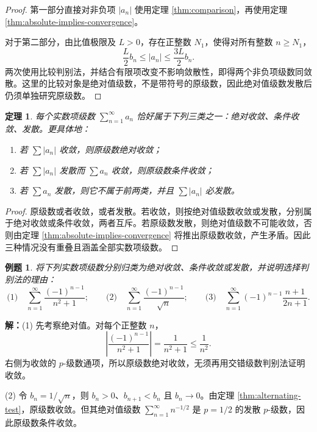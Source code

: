 \documentclass[UTF8,fontset=fandol,11pt]{ctexart}
\newtheorem{theorem}[definition]{定理}
\newtheorem{example}[definition]{例题}
\begin{document}
\begin{proof}
第一部分直接对非负项 $|a_n|$ 使用定理 \ref{thm:comparison}，再使用定理 \ref{thm:absolute-implies-convergence}。

对于第二部分，由比值极限及 $L>0$，存在正整数 $N_1$，使得对所有整数 $n\geq N_1$，
\[
\frac{L}{2}b_n\leq |a_n|\leq\frac{3L}{2}b_n.
\]
两次使用比较判别法，并结合有限项改变不影响敛散性，即得两个非负项级数同敛散。这里的比较对象是绝对值级数，不是带符号的原级数，因此绝对值级数发散后仍须单独研究原级数。
\end{proof}
\begin{theorem}
\label{thm:convergence-classification}每个实数项级数 $\sum_{n=1}^{\infty}a_n$ 恰好属于下列三类之一：绝对收敛、条件收敛、发散。更具体地：
\begin{enumerate}
\item 若 $\sum |a_n|$ 收敛，则原级数绝对收敛；
\item 若 $\sum |a_n|$ 发散而 $\sum a_n$ 收敛，则原级数条件收敛；
\item 若 $\sum a_n$ 发散，则它不属于前两类，并且 $\sum |a_n|$ 必发散。
\end{enumerate}
\end{theorem}
\begin{proof}
原级数或者收敛，或者发散。若收敛，则按绝对值级数收敛或发散，分别属于绝对收敛或条件收敛，两者互斥。若原级数发散，则绝对值级数不可能收敛，否则由定理 \ref{thm:absolute-implies-convergence} 将推出原级数收敛，产生矛盾。因此三种情况没有重叠且涵盖全部实数项级数。
\end{proof}
\begin{example}
将下列实数项级数分别归类为绝对收敛、条件收敛或发散，并说明选择判别法的理由：
\[
\text{(1)}\quad\sum_{n=1}^{\infty}\frac{(-1)^{n-1}}{n^2+1};\qquad
\text{(2)}\quad\sum_{n=1}^{\infty}\frac{(-1)^{n-1}}{\sqrt n};\qquad
\text{(3)}\quad\sum_{n=1}^{\infty}(-1)^{n-1}\frac{n+1}{2n+1}.
\]
\end{example}
\par\noindent\textbf{解：}(1) 先考察绝对值。对每个正整数 $n$，
\[
\left|\frac{(-1)^{n-1}}{n^2+1}\right|=\frac1{n^2+1}\leq\frac1{n^2}.
\]
右侧为收敛的 $p$-级数通项，所以原级数绝对收敛，无须再用交错级数判别法证明收敛。

(2) 令 $b_n=1/\sqrt n$，则 $b_n>0$、$b_{n+1}<b_n$ 且 $b_n\to0$。由定理 \ref{thm:alternating-test}，原级数收敛。但其绝对值级数 $\sum_{n=1}^{\infty}n^{-1/2}$ 是 $p=1/2$ 的发散 $p$-级数，因此原级数条件收敛。
\end{document}
